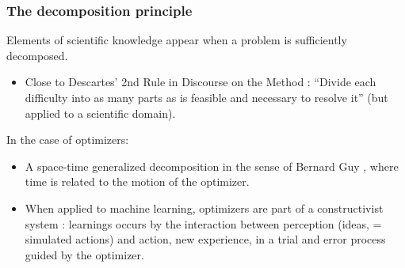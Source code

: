 \documentclass[12pt]{beamer}
\begin{document}

\begin{frame}
\frametitle{The decomposition principle}
\begin{block}{}
Elements of scientific knowledge appear when a problem is sufficiently decomposed.
\end{block}
\begin{itemize}
\item Close to Descartes' 2nd Rule in Discourse on the Method : ``Divide each difficulty into as many parts as is feasible and necessary to resolve it''
(but applied to a scientific domain).
\end{itemize}
In the case of optimizers:
\begin{itemize}
\item A space-time generalized decomposition in the sense of Bernard Guy \cite{guyTempsEspace}, where time is related to the motion of the optimizer.
\item When applied to machine learning, optimizers are part of a constructivist system \cite{sarkar2016constructivist}: learnings occurs by the interaction between perception (ideas, = simulated actions) and action, new experience, in a trial and error process guided by the optimizer.
\end{itemize}
\end{frame}
\end{document}

